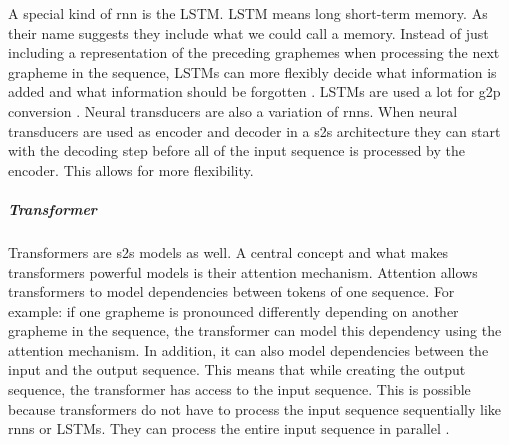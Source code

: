 A special kind of \ac{rnn} is the LSTM. LSTM means long short-term memory. As their name suggests they include what we could call a memory. Instead of just including a representation of the preceding graphemes when processing the next grapheme in the sequence, LSTMs can more flexibly decide what information is added and what information should be forgotten \citep{Olah.29.01.2022, Kostadinov.2017}. LSTMs are used a lot for \ac{g2p} conversion \citep{Lee&Ashby.2020, hammond-2021-data, gautam.2021, Rao2015GraphemetophonemeCU}.
Neural transducers are also a variation of \acp{rnn}. When neural transducers are used as encoder and decoder in a \ac{s2s} architecture they can start with the decoding step before all of the input sequence is processed by the encoder. This allows for more flexibility.


\subparagraph{Transformer}
Transformers are \ac{s2s} models as well. A central concept and what makes transformers powerful models is their attention mechanism. Attention allows transformers to model dependencies between tokens of one sequence. For example: if one grapheme is pronounced differently depending on another grapheme in the sequence, the transformer can model this dependency using the attention mechanism. In addition, it can also model dependencies between the input and the output sequence. This means that while creating the output sequence, the transformer has access to the input sequence. This is possible because transformers do not have to process the input sequence sequentially like \acp{rnn} or LSTMs. They can process the entire input sequence in parallel  \citep{Alammar.03.01.2022}.


